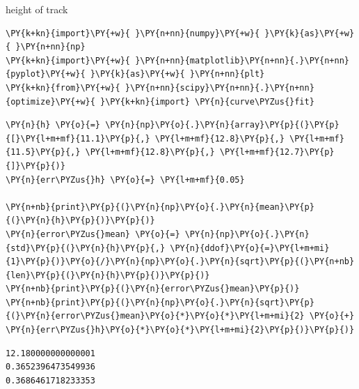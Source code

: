 
    
    height of track

    \begin{tcolorbox}[breakable, size=fbox, boxrule=1pt, pad at break*=1mm,colback=cellbackground, colframe=cellborder]
\begin{Verbatim}[commandchars=\\\{\}]
\PY{k+kn}{import}\PY{+w}{ }\PY{n+nn}{numpy}\PY{+w}{ }\PY{k}{as}\PY{+w}{ }\PY{n+nn}{np}
\PY{k+kn}{import}\PY{+w}{ }\PY{n+nn}{matplotlib}\PY{n+nn}{.}\PY{n+nn}{pyplot}\PY{+w}{ }\PY{k}{as}\PY{+w}{ }\PY{n+nn}{plt}
\PY{k+kn}{from}\PY{+w}{ }\PY{n+nn}{scipy}\PY{n+nn}{.}\PY{n+nn}{optimize}\PY{+w}{ }\PY{k+kn}{import} \PY{n}{curve\PYZus{}fit}
\end{Verbatim}
\end{tcolorbox}

    \begin{tcolorbox}[breakable, size=fbox, boxrule=1pt, pad at break*=1mm,colback=cellbackground, colframe=cellborder]
\begin{Verbatim}[commandchars=\\\{\}]
\PY{n}{h} \PY{o}{=} \PY{n}{np}\PY{o}{.}\PY{n}{array}\PY{p}{(}\PY{p}{[}\PY{l+m+mf}{11.1}\PY{p}{,} \PY{l+m+mf}{12.8}\PY{p}{,} \PY{l+m+mf}{11.5}\PY{p}{,} \PY{l+m+mf}{12.8}\PY{p}{,} \PY{l+m+mf}{12.7}\PY{p}{]}\PY{p}{)}
\PY{n}{err\PYZus{}h} \PY{o}{=} \PY{l+m+mf}{0.05}

\PY{n+nb}{print}\PY{p}{(}\PY{n}{np}\PY{o}{.}\PY{n}{mean}\PY{p}{(}\PY{n}{h}\PY{p}{)}\PY{p}{)}
\PY{n}{error\PYZus{}mean} \PY{o}{=} \PY{n}{np}\PY{o}{.}\PY{n}{std}\PY{p}{(}\PY{n}{h}\PY{p}{,} \PY{n}{ddof}\PY{o}{=}\PY{l+m+mi}{1}\PY{p}{)}\PY{o}{/}\PY{n}{np}\PY{o}{.}\PY{n}{sqrt}\PY{p}{(}\PY{n+nb}{len}\PY{p}{(}\PY{n}{h}\PY{p}{)}\PY{p}{)}
\PY{n+nb}{print}\PY{p}{(}\PY{n}{error\PYZus{}mean}\PY{p}{)}
\PY{n+nb}{print}\PY{p}{(}\PY{n}{np}\PY{o}{.}\PY{n}{sqrt}\PY{p}{(}\PY{n}{error\PYZus{}mean}\PY{o}{*}\PY{o}{*}\PY{l+m+mi}{2} \PY{o}{+} \PY{n}{err\PYZus{}h}\PY{o}{*}\PY{o}{*}\PY{l+m+mi}{2}\PY{p}{)}\PY{p}{)}
\end{Verbatim}
\end{tcolorbox}

    \begin{Verbatim}[commandchars=\\\{\}]
12.180000000000001
0.3652396473549936
0.3686461718233353
    \end{Verbatim}

